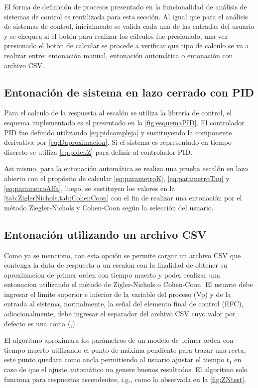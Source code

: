     El forma de definición de procesos presentado en la funcionalidad de análisis de sistemas de control es reutilizada para esta sección. Al igual que para el análisis de sistemas de control, inicialmente se valida cada una de las entradas del usuario y se chequea si el botón para realizar los cálculos fue presionado, una vez presionado el botón de calcular se procede a verificar que tipo de calculo se va a realizar entre: entonación manual, entonación automática o entonación con archivo CSV.

    \subsection{Entonación de sistema en lazo cerrado con PID}
        
        Para el calculo de la respuesta al escalón se utiliza la librería de control, el esquema implementado es el presentado en la \cref{fig:esquemaPID}. El controlador PID fue definido utilizando \cref{eq:pidcompleja} y sustituyendo la componente derivativa por \cref{eq:Daproximacion}. Si el sistema es representado en tiempo discreto se utiliza \cref{eq:pidenZ} para definir al controlador PID.
        
        Asi mismo, para la entonación automática se realiza una prueba escalón en lazo abierto con el propósito de calcular \cref{eq:parametroK}, \cref{eq:parametroTau} y \cref{eq:parametroAlfa}, luego, se sustituyen los valores en la \cref{tab:ZiglerNichols,tab:CohenCoon} con el fin de realizar una entonación por el método Ziegler-Nichols y Cohen-Coon según la selección del usuario.

    \subsection{Entonación utilizando un archivo CSV}

        Como ya se menciono, con esta opción se permite cargar un archivo CSV que contenga la data de respuesta a un escalon con la finalidad de obtener su aproximacion de primer orden con tiempo muerto y poder realizar una entonacion utilizando el método de Zigler-Nichols o Cohen-Coon. El usuario debe ingresar el limite superior e inferior de la variable del proceso (Vp) y de la entrada al sistema, normalmente, la señal del elemento final de control (EFC), adiocionalmente, debe ingresar el separador del archivo CSV cuyo valor por defecto es una coma (,).

        El algoritmo aproximara los parámetros de un modelo de primer orden con tiempo muerto utilizando el punto de máxima pendiente para trazar una recta, este punto quedara como ancla permitiendo al usuario ajustar el tiempo $t_1$ en caso de que el ajuste automático no genere buenos resultados. El algoritmo solo funciona para respuestas ascendentes, i.g., como la observada en la \cref{fig:ZNtest}.

